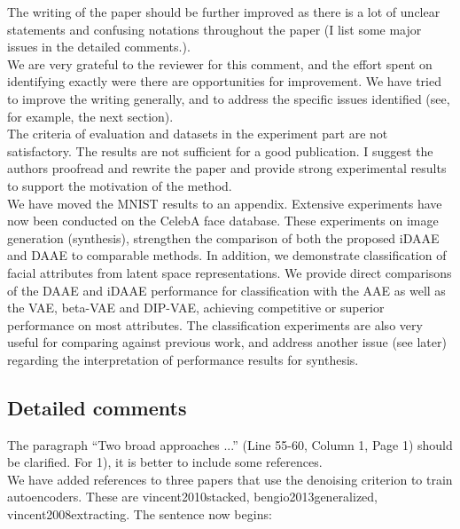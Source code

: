 \documentclass{article}
\begin{document}

{\color{blue} The writing of the paper should be further improved as there is a lot of unclear statements and confusing notations throughout the paper (I list some major issues in the detailed comments.).} \\

We are very grateful to the reviewer for this comment, and the effort spent on identifying exactly were there are opportunities for improvement. We have tried to improve the writing generally, and to address the specific issues identified (see, for example, the next section). \\

{\color{blue} The criteria of evaluation and datasets in the experiment part are not satisfactory. The results are not sufficient for a good publication. I suggest the authors proofread and rewrite the paper and provide strong experimental results to support the motivation of the method.}\\

We have moved the MNIST results to an appendix. Extensive experiments have now been conducted on the CelebA face database. These experiments on image generation (synthesis), strengthen the comparison of both the proposed iDAAE and DAAE to comparable methods. In addition, we demonstrate classification of facial attributes from latent space representations. We provide direct comparisons of the DAAE and iDAAE performance for classification with the AAE as well as the VAE, beta-VAE and DIP-VAE, achieving competitive or superior performance on most attributes. The classification experiments are also very useful for comparing against previous work, and address another issue (see later) regarding the interpretation of performance results for synthesis.\\


\subsection*{Detailed comments}

{\color{blue}
The paragraph ``Two broad approaches ...'' (Line 55-60, Column 1, Page 1) should be clarified. For 1), it is better to include some references. }  \\

We have added references to three papers that use the denoising criterion to train autoencoders.
These are {\color{red} vincent2010stacked, bengio2013generalized, vincent2008extracting}.  The sentence now begins:\\
\end{document}
